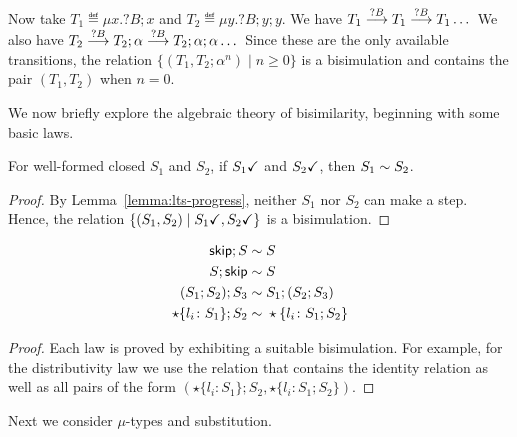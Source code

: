 Now take $T_1 \eqdef \mu x.?B;x$ and $T_2 \eqdef \mu y.?B;y;y$.
%
We have $T_1 \LTSderives[?B] T_1 \LTSderives[?B] T_1 \dots$ We also
have
$T_2 \LTSderives[?B] T_2;\alpha \LTSderives[?B]
T_2;\alpha;\alpha\dots$
Since these are the only available transitions, the relation
$\{(T_1,T_2;\alpha^n) \mid n\ge 0\}$ is a bisimulation and contains
the pair $(T_1,T_2)$ when $n=0$.


We now briefly explore the algebraic theory of bisimilarity, beginning
with some basic laws.
\begin{lemma}
  For well-formed closed $S_1$ and $S_2$, if $\DONE{S_1}$ and $\DONE{S_2}$, then $S_1 \TypeEquiv S_2$.
\end{lemma}
%
\begin{proof}
  By Lemma~\ref{lemma:lts-progress}, neither $S_1$ nor $S_2$ can make
  a step. Hence, the relation
  $\{(S_1, S_2) \mid \DONE{S_1}, \DONE{S_2} \}$ is a bisimulation.
\end{proof}

\begin{lemma}
\label{lemma:seq-laws}
  \begin{align*}
    \skipk;S \TypeEquiv&\; S
    \\
    S;\skipk \TypeEquiv&\; S
    \\
    (S_1;S_2);S_3 \TypeEquiv&\; S_1;(S_2;S_3)
    \\
    \star\{l_i\colon S_1\};S_2 \TypeEquiv&\; \star\{l_i\colon S_1;S_2\}
  \end{align*}
\end{lemma}
%
\begin{proof}
  Each law is proved by exhibiting a suitable bisimulation. For
  example, for the distributivity law we use the relation that
  contains the identity relation as well as all pairs of the form
  $(\star\{l_i\colon S_1\};S_2, \star\{l_i\colon S_1;S_2\})$.
\end{proof}

Next we consider $\mu$-types and substitution.

